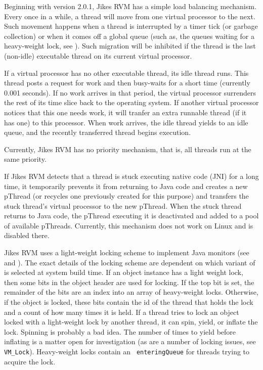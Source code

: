 Beginning with version 2.0.1, Jikes RVM has a simple load balancing
mechanism. Every once in a while, a thread will move from one virtual
processor to the next.  Such movement happens when a thread is
interrupted by a timer tick (or garbage collection) or when it comes
off a global queue (such as, the queues waiting for a heavy-weight
lock, see ).  Such migration will be
inhibited if the thread is the last (non-idle) executable thread on
its current virtual processor.  

If a virtual processor has no other executable thread, its idle thread
runs.  This thread posts a request for work and then busy-waits for a
short time (currently 0.001 seconds).  If no work arrives in that
period, the virtual processor surrenders the rest of its time slice
back to the operating system.  If another virtual processor notices
that this one needs work, it will tranfer an extra runnable thread (if
it has one) to this processor.  When work arrives, the idle thread
yields to an idle queue, and the recently transferred thread begins
execution.

Currently, Jikes RVM has no priority mechanism, that is, all threads run at
the same priority.

If Jikes RVM detects that a thread is stuck executing native code (JNI)
for a long time, it temporarily prevents it from returning to Java code and
creates a new pThread (or recycles one previously created for this 
purpose) and transfers the stuck thread's virtual processor to the
new pThread.  When the stuck thread returns to Java code, the pThread
executing it is deactivated and added to a pool of available pThreads.
Currently, this mechanism does not work on Linux and is disabled there.

Jikes RVM uses a light-weight locking scheme to implement Java monitors (see
 and 
). The exact details of the
locking scheme are dependent on which variant of 
 is selected at
system build time.  If an object instance has a light weight lock,
then some bits in the object header are used for locking.  
If the top bit is set, the remainder of the bits 
are an index into an array of heavy-weight locks.
Otherwise, if the object is locked, these bits contain the id of the
thread that holds the lock and a count of how many times it is held.
If a thread tries to lock an object locked with a light-weight lock by
another thread, it can spin, yield, or inflate the lock.  Spinning is
probably a bad idea.  The number of times to yield before inflating is
a matter open for investigation (as are a number of locking
issues, see {\tt VM\_Lock}).  Heavy-weight locks contain an {\tt
enteringQueue} for threads trying to acquire the lock.

